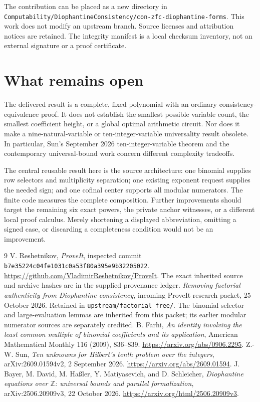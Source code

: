 \documentclass[11pt]{article}
\theoremstyle{remark}\newtheorem{remark}[theorem]{Remark}
\newcommand{\Z}{\mathbb Z}\newcommand{\N}{\mathbb N}
\begin{document}
The contribution can be placed as a new directory in
\nolinkurl{Computability/DiophantineConsistency/con-zfc-diophantine-forms}.
This work does not modify an upstream branch. Source licenses and
attribution notices are retained. The integrity manifest is a local
checksum inventory, not an external signature or a proof certificate.

\section{What remains open}

The delivered result is a complete, fixed polynomial with an ordinary
consistency-equivalence proof. It does not establish the smallest
possible variable count, the smallest coefficient height, or a global
optimal arithmetic circuit. Nor does it make a nine-natural-variable
or ten-integer-variable universality result obsolete. In particular,
Sun's September 2026 ten-integer-variable theorem \cite{sun10}
and the contemporary universal-bound work \cite{bayer} concern
different complexity tradeoffs.

The central reusable result here is the source architecture:
one binomial supplies row selectors and multiplicity separation;
one existing exponent request supplies the needed sign; and one
cofinal center supports all modular numerators. The finite code measures
the complete composition. Further improvements should target the
remaining six exact powers, the private anchor witnesses, or a
different local proof calculus. Merely shortening a displayed
abbreviation, omitting a signed case, or discarding a completeness
condition would not be an improvement.

\begin{thebibliography}{9}
 V. Reshetnikov, \emph{ProveIt}, inspected commit
\texttt{b7e35224c04fe1031c0a53f80a395e9b32205022}.
\url{https://github.com/VladimirReshetnikov/ProveIt}.
The exact inherited source and archive hashes are in the supplied provenance ledger.
 \emph{Removing factorial authenticity from
Diophantine consistency}, incoming ProveIt research packet,
25 October 2026. Retained in \nolinkurl{upstream/factorial_free/}.
The binomial selector and large-evaluation lemmas are inherited from
this packet; its earlier modular numerator sources are separately credited.
 B. Farhi, \emph{An identity involving the least common
multiple of binomial coefficients and its application},
American Mathematical Monthly 116 (2009), 836--839.
\url{https://arxiv.org/abs/0906.2295}.
 Z.-W. Sun, \emph{Ten unknowns for Hilbert's tenth
problem over the integers}, arXiv:2609.01594v2, 2 September 2026.
\url{https://arxiv.org/abs/2609.01594}.
 J. Bayer, M. David, M. Ha\ss ler, Y. Matiyasevich,
and D. Schleicher, \emph{Diophantine equations over $\Z$: universal
bounds and parallel formalization}, arXiv:2506.20909v3,
22 October 2026. \url{https://arxiv.org/html/2506.20909v3}.
\end{thebibliography}
\end{document}
